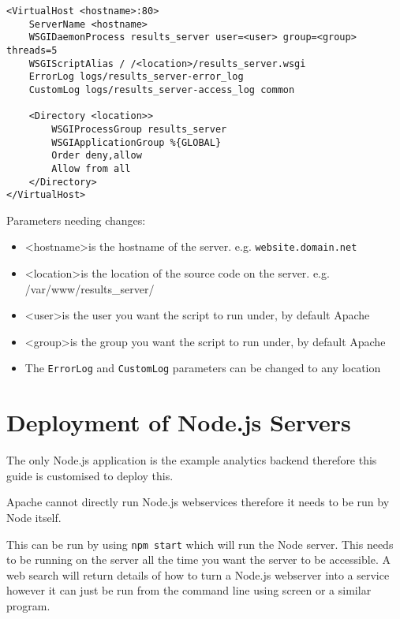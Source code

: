 \begin{lstlisting}[caption={Apache configuration}, label={code:apacheConfig_flask}]
<VirtualHost <hostname>:80>
	ServerName <hostname>
	WSGIDaemonProcess results_server user=<user> group=<group> threads=5
	WSGIScriptAlias / /<location>/results_server.wsgi
	ErrorLog logs/results_server-error_log
	CustomLog logs/results_server-access_log common

	<Directory <location>>
		WSGIProcessGroup results_server
		WSGIApplicationGroup %{GLOBAL}
		Order deny,allow
		Allow from all
	</Directory>
</VirtualHost>
\end{lstlisting}

\newpage
Parameters needing changes:

\begin{itemize}
\item \textless hostname\textgreater is the hostname of the server. e.g. \lstinline|website.domain.net|
\item \textless location\textgreater is the location of the source code on the server. e.g. /var/www/results\_server/
\item \textless user\textgreater is the user you want the script to run under, by default Apache
\item \textless group\textgreater is the group you want the script to run under, by default Apache
\item The \lstinline|ErrorLog| and \lstinline|CustomLog| parameters can be changed to any location

\end{itemize}

\section{Deployment of Node.js Servers} \label{Section:Deployment of Node.js Servers}

The only Node.js application is the example analytics backend therefore this guide is customised to deploy this.

Apache cannot directly run Node.js webservices therefore it needs to be run by Node itself.

This can be run by using \lstinline|npm start| which will run the Node server. This needs to be running on the server all the time you want the server to be accessible.
A web search will return details of how to turn a Node.js webserver into a service however it can just be run from the command line using screen or a similar program.


